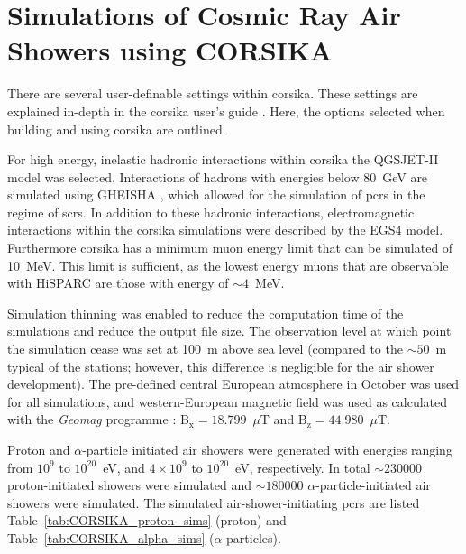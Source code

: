\chapter{Simulations of Cosmic Ray Air Showers using CORSIKA}\label{app:CORSIKA_sims}


There are several user-definable settings within \gls{corsika}. These settings are explained in-depth in the \gls{corsika} user's guide \citep{heck_extensive_2017}. Here, the options selected when building and using \gls{corsika} are outlined.

For high energy, inelastic hadronic interactions within \gls{corsika} the QGSJET-II \citep{ostapchenko_qgsjet-ii_2006} model was selected. Interactions of hadrons with energies below 80~GeV are simulated using GHEISHA \citep{fesefeldt_gheisha._1985}, which allowed for the simulation of \glspl{pcr} in the regime of \glspl{scr}. In addition to these hadronic interactions, electromagnetic interactions within the \gls{corsika} simulations were described by the EGS4 \citep{nelson_egs4_1985} model. Furthermore \gls{corsika} has a minimum muon energy limit that can be simulated of 10~MeV. This limit is sufficient, as the lowest energy muons that are observable with HiSPARC are those with energy of $\sim4$~MeV.

Simulation thinning was enabled to reduce the computation time of the simulations and reduce the output file size. The observation level at which point the simulation cease was set at 100~m above sea level (compared to the $\sim50$~m typical of the stations; however, this difference is negligible for the air shower development). The pre-defined central European atmosphere in October was used for all simulations, and western-European magnetic field was used as calculated with the \textit{Geomag} programme \citep{bgs_world_2020}: B$_{\mathrm{x}}=18.799$~$\mu$T and B$_{\mathrm{z}}=44.980$~$\mu$T.

Proton and $\alpha$-particle initiated air showers were generated with energies ranging from $10^{9}$ to $10^{20}$~eV, and $4\times10^{9}$ to $10^{20}$~eV, respectively. In total $\sim 230000$ proton-initiated showers were simulated and $\sim 180000$ $\alpha$-particle-initiated air showers were simulated. The simulated air-shower-initiating \glspl{pcr} are listed Table~\ref{tab:CORSIKA_proton_sims} (proton) and Table~\ref{tab:CORSIKA_alpha_sims} ($\alpha$-particles).


